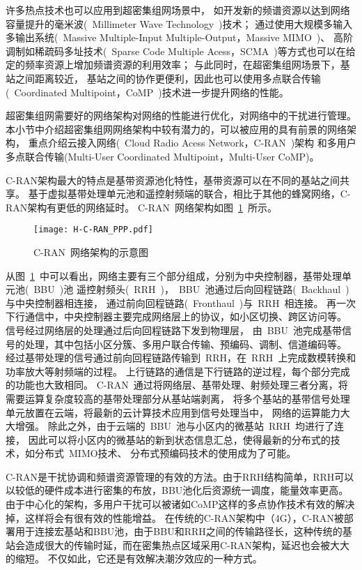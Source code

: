 许多热点技术也可以应用到超密集组网场景中，
如开发新的频谱资源以达到网络容量提升的毫米波(~Millimeter Wave Technology~)技术；
通过使用大规模多输入多输出系统(~Massive Multiple-Input Multiple-Output，Massive MIMO~)、
高阶调制如稀疏码多址技术(~Sparse Code Multiple Acess，SCMA~)等方式也可以在给定的频率资源上增加频谱资源的利用效率；
与此同时，在超密集组网场景下，基站之间距离较近，
基站之间的协作更便利，因此也可以使用多点联合传输(~Coordinated Multipoint，CoMP~)技术进一步提升网络的性能。

超密集组网需要好的网络架构对网络的性能进行优化，对网络中的干扰进行管理。
本小节中介绍超密集组网网络架构中较有潜力的，可以被应用的具有前景的网络架构，
重点介绍云接入网络(~Cloud Radio Acess Network，C-RAN~)架构
和多用户多点联合传输(Multi-User Coordinated Multipoint，Multi-User CoMP)。

C-RAN架构最大的特点是基带资源池化特性，基带资源可以在不同的基站之间共享。
基于虚拟基带处理单元池和遥控射频端的联合，相比于其他的蜂窝网络，C-RAN架构有更低的网络延时。
C-RAN~网络架构如图~\ref{C-RAN}~所示。
\begin{figure}[htbp]
\centering
\texttt{[image: H-C-RAN\_PPP.pdf]}
\caption{C-RAN~网络架构的示意图}\vspace{-1.5em}
\label{C-RAN}
\end{figure}
从图~\ref{C-RAN}~中可以看出，网络主要有三个部分组成，分别为中央控制器，基带处理单元池(~BBU~)池
遥控射频头(~RRH~)，~BBU~池通过后向回程链路(~Backhaul~)与中央控制器相连接，
通过前向回程链路(~Fronthaul~)与~RRH~相连接。
再一次下行通信中，中央控制器主要完成网络层上的协议，如小区切换、跨区访问等。
信号经过网络层的处理通过后向回程链路下发到物理层，
由~BBU~池完成基带信号的处理，其中包括小区分簇、多用户联合传输、预编码、调制、信道编码等。
经过基带处理的信号通过前向回程链路传输到~RRH，在~RRH~上完成数模转换和功率放大等射频端的过程。
上行链路的通信是下行链路的逆过程，每个部分完成的功能也大致相同。
C-RAN~通过将网络层、基带处理、射频处理三者分离，将需要运算复杂度较高的基带处理部分从基站端剥离，
将多个基站的基带信号处理单元放置在云端，将最新的云计算技术应用到信号处理当中，
网络的运算能力大大增强。
除此之外，由于云端的~BBU~池与小区内的微基站~RRH~均进行了连接，
因此可以将小区内的微基站的新到状态信息汇总，使得最新的分布式的技术，如分布式~MIMO技术、
分布式预编码技术的使用成为了可能。

C-RAN是干扰协调和频谱资源管理的有效的方法。由于RRH结构简单，RRH可以以较低的硬件成本进行密集的布放，BBU池化后资源统一调度，能量效率更高。
由于中心化的架构，多用户干扰可以被诸如CoMP这样的多点协作技术有效的解决掉，这样将会有很有效的性能增益。
在传统的C-RAN架构中（4G），C-RAN被部署用于连接宏基站和BBU池，由于BBU和RRH之间的传输路径长，这种传统的基站会造成很大的传输时延，而在密集热点区域采用C-RAN架构，延迟也会被大大的缩短。
不仅如此，它还是有效解决潮汐效应的一种方式。

